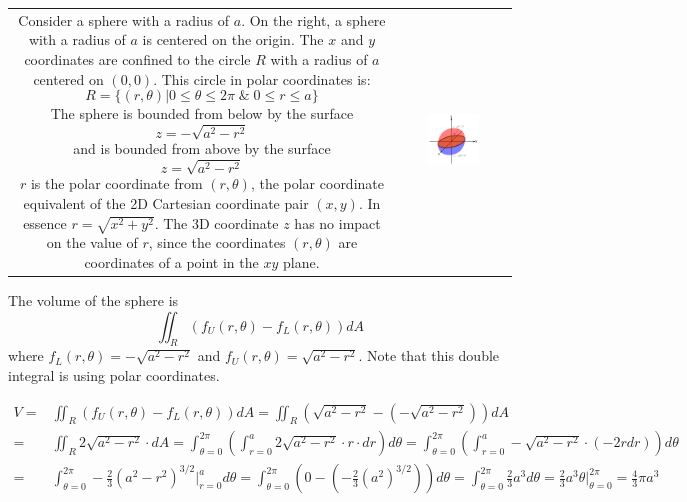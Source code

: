 \documentclass{article}
\begin{document}
\begin{itemize}
\begin{tabular}{cc} 
\parbox{0.5\textwidth}{
Consider a sphere with a radius of \(a\). On the right, a sphere with a radius of \(a\) is centered on the origin. The \(x\) and \(y\) coordinates are confined to the circle \(R\) with a radius of \(a\) centered on \((0,0)\). This circle in polar coordinates is:
\[R = \{(r,\theta) | 0 \leq \theta \leq 2\pi \;\&\; 0 \leq r \leq a\}\]
The sphere is bounded from below by the surface 
\[z = -\sqrt{a^2 - r^2}\]
and is bounded from above by the surface 
\[z = \sqrt{a^2 - r^2}\]
\(r\) is the polar coordinate from \((r, \theta)\), the polar coordinate equivalent of the 2D Cartesian coordinate pair \((x,y)\). In essence \(r = \sqrt{x^2 + y^2}\). The 3D coordinate \(z\) has no impact on the value of \(r\), since the coordinates \((r, \theta)\) are coordinates of a point in the \(xy\) plane. 
} & \parbox{0.5\textwidth}{
\includegraphics[width = 0.5\textwidth]{sphere_volume}
}
\end{tabular}

The volume of the sphere is 
\[\iint_R (f_U(r,\theta) - f_L(r,\theta))dA\]
where \(f_L(r,\theta) = -\sqrt{a^2 - r^2}\) and \(f_U(r,\theta) = \sqrt{a^2 - r^2}\). Note that this double integral is using polar coordinates.

\begin{align*}
V = & \iint_R (f_U(r,\theta) - f_L(r,\theta))dA 
= \iint_R (\sqrt{a^2 - r^2} - (-\sqrt{a^2 - r^2}))dA \\ 
= & \iint_R 2\sqrt{a^2 - r^2} \cdot dA   
= \int_{\theta = 0}^{2\pi} \left(\int_{r = 0}^a 2\sqrt{a^2 - r^2} \cdot r \cdot dr \right)d\theta 
= \int_{\theta = 0}^{2\pi} \left(\int_{r = 0}^a -\sqrt{a^2 - r^2} \cdot (-2rdr) \right)d\theta \\
= & \int_{\theta = 0}^{2\pi} -\frac{2}{3}(a^2 - r^2)^{3/2}\Big|_{r = 0}^a d\theta  
= \int_{\theta = 0}^{2\pi} (0 - (-\frac{2}{3}(a^2)^{3/2})) d\theta 
= \int_{\theta = 0}^{2\pi} \frac{2}{3}a^3 d\theta   
= \frac{2}{3}a^3\theta\bigg|_{\theta = 0}^{2\pi} 
= \frac{4}{3}\pi a^3
\end{align*}


\end{itemize}
\end{document}
